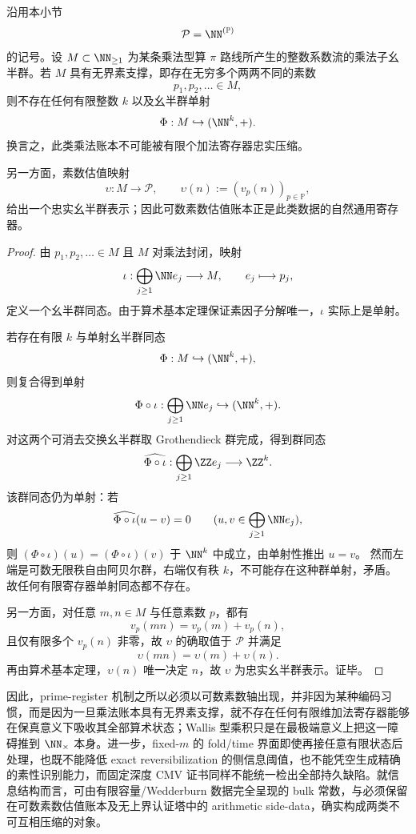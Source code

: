 \begin{theorem}\label{thm:conclusion-unbounded-prime-support-no-finite-register-embedding}
沿用本小节
\[
\mathcal P=\NN^{(\mathbb P)}
\]
的记号。设 \(M\subset\NN_{\ge 1}\) 为某条乘法型算 \(\pi\) 路线所产生的整数系数流的乘法子幺半群。若 \(M\) 具有无界素支撑，即存在无穷多个两两不同的素数
\[
p_1,p_2,\dots \in M,
\]
则不存在任何有限整数 \(k\) 以及幺半群单射
\[
\Phi:M\hookrightarrow (\NN^k,+).
\]
换言之，此类乘法账本不可能被有限个加法寄存器忠实压缩。

另一方面，素数估值映射
\[
\upsilon:M\to\mathcal P,
\qquad
\upsilon(n):=(v_p(n))_{p\in\mathbb P},
\]
给出一个忠实幺半群表示；因此可数素数估值账本正是此类数据的自然通用寄存器。
\end{theorem}
\begin{proof}
由 \(p_1,p_2,\dots\in M\) 且 \(M\) 对乘法封闭，映射
\[
\iota:\bigoplus_{j\ge 1}\NN e_j\longrightarrow M,
\qquad
e_j\longmapsto p_j,
\]
定义一个幺半群同态。由于算术基本定理保证素因子分解唯一，\(\iota\) 实际上是单射。

若存在有限 \(k\) 与单射幺半群同态
\[
\Phi:M\hookrightarrow(\NN^k,+),
\]
则复合得到单射
\[
\Phi\circ\iota:\bigoplus_{j\ge 1}\NN e_j\hookrightarrow (\NN^k,+).
\]
对这两个可消去交换幺半群取 Grothendieck 群完成，得到群同态
\[
\widehat{\Phi\circ\iota}:\bigoplus_{j\ge 1}\ZZ e_j\longrightarrow \ZZ^k.
\]
该群同态仍为单射：若
\[
\widehat{\Phi\circ\iota}(u-v)=0
\qquad
(u,v\in \bigoplus_{j\ge 1}\NN e_j),
\]
则 \((\Phi\circ\iota)(u)=(\Phi\circ\iota)(v)\) 于 \(\NN^k\) 中成立，由单射性推出 \(u=v\)。
然而左端是可数无限秩自由阿贝尔群，右端仅有秩 \(k\)，不可能存在这种群单射，矛盾。
故任何有限寄存器单射同态都不存在。

另一方面，对任意 \(m,n\in M\) 与任意素数 \(p\)，都有
\[
v_p(mn)=v_p(m)+v_p(n),
\]
且仅有限多个 \(v_p(n)\) 非零，故 \(\upsilon\) 的确取值于 \(\mathcal P\) 并满足
\[
\upsilon(mn)=\upsilon(m)+\upsilon(n).
\]
再由算术基本定理，\(\upsilon(n)\) 唯一决定 \(n\)，故 \(\upsilon\) 为忠实幺半群表示。证毕。
\end{proof}





\noindent
因此，prime-register 机制之所以必须以可数素数轴出现，并非因为某种编码习惯，而是因为一旦乘法账本具有无界素支撑，就不存在任何有限维加法寄存器能够在保真意义下吸收其全部算术状态；Wallis 型乘积只是在最极端意义上把这一障碍推到 \(\NN_{\times}\) 本身。进一步，fixed-\(m\) 的 fold/time 界面即使再接任意有限状态后处理，也既不能降低 exact reversibilization 的侧信息阈值，也不能凭空生成精确的素性识别能力，而固定深度 CMV 证书同样不能统一检出全部持久缺陷。就信息结构而言，可由有限容量/Wedderburn 数据完全呈现的 bulk 常数，与必须保留在可数素数估值账本及无上界认证塔中的 arithmetic side-data，确实构成两类不可互相压缩的对象。

\endinput
